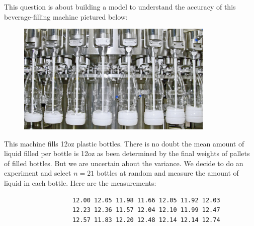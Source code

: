 \documentclass[12pt]{article}
\begin{document}
\problem This question is about building a model to understand the accuracy of this beverage-filling machine pictured below:

\begin{figure}[htp]
\centering
\includegraphics[width=3.7in]{milk_filling.jpg}
\end{figure}

This machine fills 12oz plastic bottles. There is no doubt the mean amount of liquid filled per bottle is 12oz as been determined by the final weights of pallets of filled bottles. But we are uncertain about the variance. We decide to do an experiment and select $n = 21$ bottles at random and measure the amount of liquid in each bottle. Here are the measurements:

\begin{verbatim}
                   12.00 12.05 11.98 11.66 12.05 11.92 12.03
                   12.23 12.36 11.57 12.04 12.10 11.99 12.47
                   12.57 11.83 12.20 12.48 12.14 12.14 12.74
\end{verbatim}

\begin{enumerate}









\end{enumerate}
\end{document}
